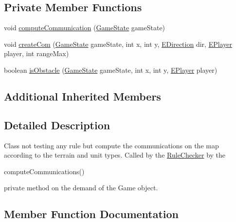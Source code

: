 \subsection*{Private Member Functions}
\begin{DoxyCompactItemize}
\item 
void \mbox{\hyperlink{classrule_engine_1_1rules_1_1master_rules_1_1_comm_rules_af8de9ef94d7ef2e2878534c7716490fc}{compute\+Communication}} (\mbox{\hyperlink{classgame_1_1game_state_1_1_game_state}{Game\+State}} game\+State)
\item 
void \mbox{\hyperlink{classrule_engine_1_1rules_1_1master_rules_1_1_comm_rules_a53d83ec67dede91baf381c333465c96f}{create\+Com}} (\mbox{\hyperlink{classgame_1_1game_state_1_1_game_state}{Game\+State}} game\+State, int x, int y, \mbox{\hyperlink{enumgame_1_1board_1_1_e_direction}{E\+Direction}} dir, \mbox{\hyperlink{enumgame_1_1_e_player}{E\+Player}} player, int range\+Max)
\item 
boolean \mbox{\hyperlink{classrule_engine_1_1rules_1_1master_rules_1_1_comm_rules_a8ce09b7e1c34043c5a768294cbc6adcd}{is\+Obstacle}} (\mbox{\hyperlink{classgame_1_1game_state_1_1_game_state}{Game\+State}} game\+State, int x, int y, \mbox{\hyperlink{enumgame_1_1_e_player}{E\+Player}} player)
\end{DoxyCompactItemize}
\subsection*{Additional Inherited Members}


\subsection{Detailed Description}
Class not testing any rule but compute the communications on the map according to the terrain and unit types. Called by the \mbox{\hyperlink{classrule_engine_1_1_rule_checker}{Rule\+Checker}} by the
\begin{DoxyCode}
computeCommunications() 
\end{DoxyCode}
 private method on the demand of the Game object. 

\subsection{Member Function Documentation}
\mbox{\label{classrule_engine_1_1rules_1_1master_rules_1_1_comm_rules_a57094df71e5c0d9d6e8dd10cf33d23c5}} 
